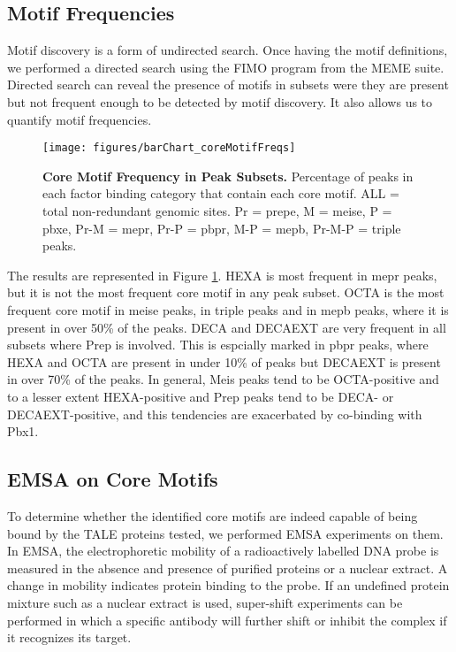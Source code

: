\subsection{Motif Frequencies}

Motif discovery is a form of undirected search. Once having the motif definitions, we performed a directed search using the FIMO program from the MEME suite. Directed search can reveal the presence of motifs in subsets were they are present but not frequent enough to be detected by motif discovery. It also allows us to quantify motif frequencies.

\begin{figure}[]
  \centering
  \texttt{[image: figures/barChart\_coreMotifFreqs]}
  \caption[Core Motif Frequency in Peak Subsets]{\textbf{Core Motif Frequency in Peak Subsets.} Percentage of peaks in each factor binding category that contain each core motif. ALL = total non-redundant genomic sites. Pr = \ac{prepe}, M = \ac{meise}, P = \ac{pbxe}, Pr-M = \ac{mepr}, Pr-P = \ac{pbpr}, M-P = \ac{mepb}, Pr-M-P = triple peaks.}
  \label{fig:coreMotifFreqs}
\end{figure}

The results are represented in Figure \ref{fig:coreMotifFreqs}. \ac{HEXA} is most frequent in \ac{mepr} peaks, but it is not the most frequent core motif in any peak subset. \ac{OCTA} is the most frequent core motif in \ac{meise} peaks, in triple peaks and in \ac{mepb} peaks, where it is present in over 50\% of the peaks. \ac{DECA} and \ac{DECAEXT} are very frequent in all subsets where Prep is involved. This is espcially marked in \ac{pbpr} peaks, where \ac{HEXA} and \ac{OCTA} are present in under 10\% of peaks but  \ac{DECAEXT} is present in over 70\% of the peaks. In general, Meis peaks tend to be \ac{OCTA}-positive and to a lesser extent \ac{HEXA}-positive and Prep peaks tend to be \ac{DECA}- or \ac{DECAEXT}-positive, and this tendencies are exacerbated by co-binding with Pbx1. 

\subsection{EMSA on Core Motifs}

To determine whether the identified core motifs are indeed capable of being bound by the \ac{TALE} proteins tested, we performed \ac{EMSA} experiments on them. In \ac{EMSA}, the electrophoretic mobility of a radioactively labelled DNA probe is measured in the absence and presence of purified proteins or a nuclear extract. A change in mobility indicates protein binding to the probe. If an undefined protein mixture such as a nuclear extract is used, super-shift experiments can be performed in which a specific antibody will further shift or inhibit the complex if it recognizes its target.

